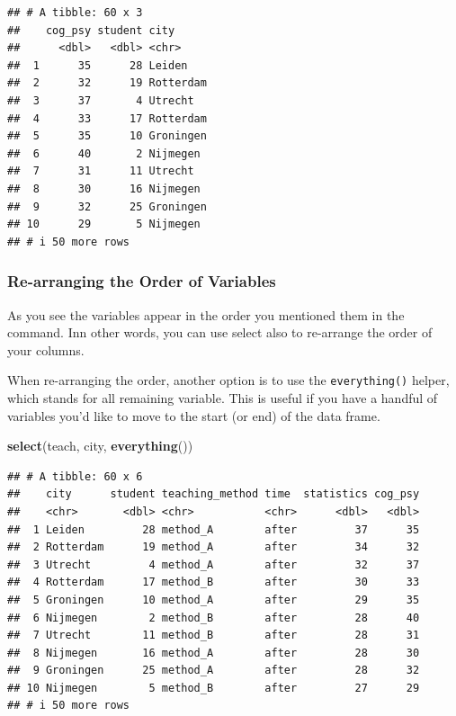 \documentclass[
]{scrartcl}
\newenvironment{Shaded}{\begin{snugshade}}{\end{snugshade}}
\newcommand{\FunctionTok}[1]{\textcolor[rgb]{0.13,0.29,0.53}{\textbf{#1}}}
\newcommand{\NormalTok}[1]{#1}
\begin{document}
\begin{verbatim}
## # A tibble: 60 x 3
##    cog_psy student city     
##      <dbl>   <dbl> <chr>    
##  1      35      28 Leiden   
##  2      32      19 Rotterdam
##  3      37       4 Utrecht  
##  4      33      17 Rotterdam
##  5      35      10 Groningen
##  6      40       2 Nijmegen 
##  7      31      11 Utrecht  
##  8      30      16 Nijmegen 
##  9      32      25 Groningen
## 10      29       5 Nijmegen 
## # i 50 more rows
\end{verbatim}

\subsubsection{Re-arranging the Order of Variables}\label{re-arranging-the-order-of-variables}

As you see the variables appear in the order you mentioned them in the command. Inn other words, you can use select also to re-arrange the order of your columns.

When re-arranging the order, another option is to use the \texttt{everything()} helper, which stands for all remaining variable. This is useful if you have a handful of variables you'd like to move to the start (or end) of the data frame.

\begin{Shaded}
\begin{Highlighting}[]
\FunctionTok{select}\NormalTok{(teach,  city, }\FunctionTok{everything}\NormalTok{())}
\end{Highlighting}
\end{Shaded}

\begin{verbatim}
## # A tibble: 60 x 6
##    city      student teaching_method time  statistics cog_psy
##    <chr>       <dbl> <chr>           <chr>      <dbl>   <dbl>
##  1 Leiden         28 method_A        after         37      35
##  2 Rotterdam      19 method_A        after         34      32
##  3 Utrecht         4 method_A        after         32      37
##  4 Rotterdam      17 method_B        after         30      33
##  5 Groningen      10 method_A        after         29      35
##  6 Nijmegen        2 method_B        after         28      40
##  7 Utrecht        11 method_B        after         28      31
##  8 Nijmegen       16 method_A        after         28      30
##  9 Groningen      25 method_A        after         28      32
## 10 Nijmegen        5 method_B        after         27      29
## # i 50 more rows
\end{verbatim}
\end{document}
